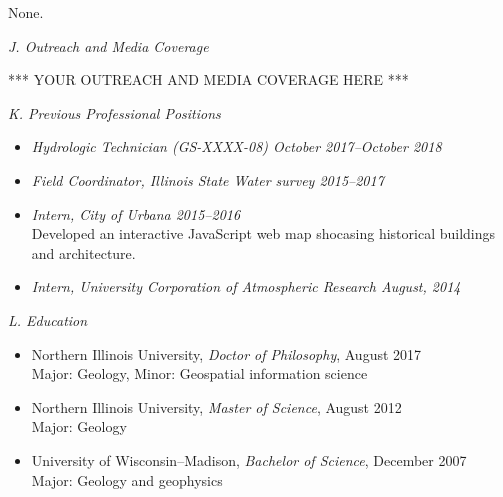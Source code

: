 \documentclass[12pt]{article}
\begin{document}
None.


\vspace{10pt}
\raggedright \large \textit{J. Outreach and Media Coverage} \\
\normalsize
\vspace{10pt}





*** YOUR OUTREACH AND MEDIA COVERAGE HERE ***





\vspace{10pt}
\raggedright \large \textit{K. Previous Professional Positions} \\
\normalsize
\vspace{10pt}




\begin{itemize}
\item \textit{Hydrologic Technician (GS-XXXX-08) \hfill October 2017--October 2018}

\item \textit{Field Coordinator, Illinois State Water survey \hfill 2015--2017}
\item \textit{Intern, City of Urbana \hfill 2015--2016} \\
  Developed an interactive JavaScript web map shocasing historical buildings and architecture.
\item \textit{Intern, University Corporation of Atmospheric Research \hfill August, 2014}
\end{itemize}



\vspace{10pt}
\raggedright \large \textit{L. Education} \\
\normalsize
\vspace{10pt}


\begin{itemize}
\item Northern Illinois University, \textit{Doctor of Philosophy}, August 2017\\
Major: Geology, Minor: Geospatial information science
\item Northern Illinois University, \textit{Master of Science}, August 2012\\
Major: Geology
\item University of Wisconsin--Madison, \textit{Bachelor of Science}, December 2007\\
Major: Geology and geophysics
\end{itemize}
\end{document}
